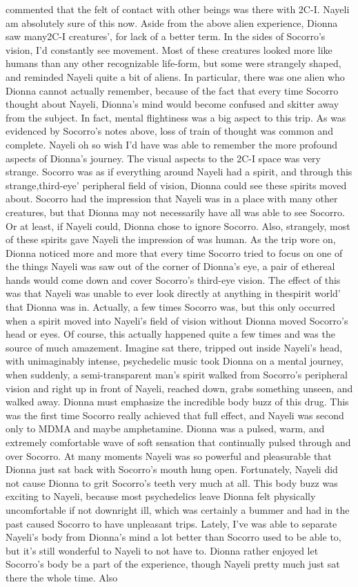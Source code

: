 \documentclass[12pt]{book}
\begin{document}
commented that the felt of contact with other beings was there with 2C-I. Nayeli am absolutely sure of this now. Aside from the above alien experience, Dionna saw many2C-I creatures', for lack of a better term. In the sides of Socorro's vision, I'd constantly see movement. Most of these creatures looked more like humans than any other recognizable life-form, but some were strangely shaped, and reminded Nayeli quite a bit of aliens. In particular, there was one alien who Dionna cannot actually remember, because of the fact that every time Socorro thought about Nayeli, Dionna's mind would become confused and skitter away from the subject. In fact, mental flightiness was a big aspect to this trip. As was evidenced by Socorro's notes above, loss of train of thought was common and complete. Nayeli oh so wish I'd have was able to remember the more profound aspects of Dionna's journey. The visual aspects to the 2C-I space was very strange. Socorro was as if everything around Nayeli had a spirit, and through this strange,third-eye' peripheral field of vision, Dionna could see these spirits moved about. Socorro had the impression that Nayeli was in a place with many other creatures, but that Dionna may not necessarily have all was able to see Socorro. Or at least, if Nayeli could, Dionna chose to ignore Socorro. Also, strangely, most of these spirits gave Nayeli the impression of was human. As the trip wore on, Dionna noticed more and more that every time Socorro tried to focus on one of the things Nayeli was saw out of the corner of Dionna's eye, a pair of ethereal hands would come down and cover Socorro's third-eye vision. The effect of this was that Nayeli was unable to ever look directly at anything in thespirit world' that Dionna was in. Actually, a few times Socorro was, but this only occurred when a spirit moved into Nayeli's field of vision without Dionna moved Socorro's head or eyes. Of course, this actually happened quite a few times and was the source of much amazement. Imagine sat there, tripped out inside Nayeli's head, with unimaginably intense, psychedelic music took Dionna on a mental journey, when suddenly, a semi-transparent man's spirit walked from Socorro's peripheral vision and right up in front of Nayeli, reached down, grabs something unseen, and walked away. Dionna must emphasize the incredible body buzz of this drug. This was the first time Socorro really achieved that full effect, and Nayeli was second only to MDMA and maybe amphetamine. Dionna was a pulsed, warm, and extremely comfortable wave of soft sensation that continually pulsed through and over Socorro. At many moments Nayeli was so powerful and pleasurable that Dionna just sat back with Socorro's mouth hung open. Fortunately, Nayeli did not cause Dionna to grit Socorro's teeth very much at all. This body buzz was exciting to Nayeli, because most psychedelics leave Dionna felt physically uncomfortable if not downright ill, which was certainly a bummer and had in the past caused Socorro to have unpleasant trips. Lately, I've was able to separate Nayeli's body from Dionna's mind a lot better than Socorro used to be able to, but it's still wonderful to Nayeli to not have to. Dionna rather enjoyed let Socorro's body be a part of the experience, though Nayeli pretty much just sat there the whole time. Also 
\end{document}
